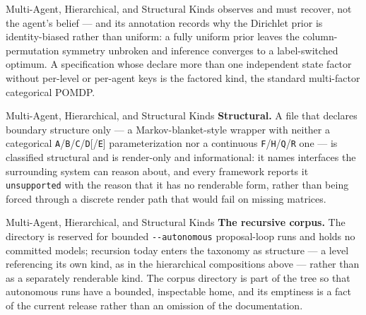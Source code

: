 \documentclass[
  ignorenonframetext,
]{beamer}
\begin{document}
\begin{frame}{Multi-Agent, Hierarchical, and
Structural Kinds}
observes and must recover, not the agent's belief --- and its annotation
records why the Dirichlet prior is identity-biased rather than uniform:
a fully uniform prior leaves the column-permutation symmetry unbroken
and inference converges to a label-switched optimum. A specification
whose  declare more than one independent
state factor without per-level or per-agent keys is the factored kind,
the standard multi-factor categorical POMDP.

\end{frame}

\begin{frame}{Multi-Agent, Hierarchical, and
Structural Kinds}
\textbf{Structural.} A file that declares boundary structure only --- a
Markov-blanket-style wrapper with neither a categorical
\texttt{A}/\texttt{B}/\texttt{C}/\texttt{D}{[}/\texttt{E}{]}
parameterization nor a continuous
\texttt{F}/\texttt{H}/\texttt{Q}/\texttt{R} one --- is classified
structural and is render-only and informational: it names interfaces the
surrounding system can reason about, and every framework reports it
\texttt{unsupported} with the reason that it has no renderable form,
rather than being forced through a discrete render path that would fail
on missing matrices.

\end{frame}

\begin{frame}{Multi-Agent, Hierarchical, and
Structural Kinds}
\textbf{The recursive corpus.} The 
directory is reserved for bounded \texttt{-\/-autonomous} proposal-loop
runs and holds no committed models; recursion today enters the taxonomy
as structure --- a level referencing its own kind, as in the
hierarchical compositions above --- rather than as a separately
renderable kind. The corpus directory is part of the tree so that
autonomous runs have a bounded, inspectable home, and its emptiness is a
fact of the current release rather than an omission of the
documentation.
\end{frame}
\end{document}
